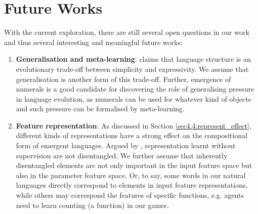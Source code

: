 \section{Future Works}
\label{sec5.2:future_work}

With the current exploration, there are still several open questions in our work and thus several interesting and meaningful future works:

\begin{enumerate}
    \item \textbf{Generalisation and meta-learning}: \cite{smith2013linguistic} claims that language structure is an evolutionary trade-off between simplicity and expressivity. We assume that generalisation is another form of this trade-off. Further, emergence of numerals is a good candidate for discovering the role of generalising pressure in language evolution, as numerals can be used for whatever kind of objects and such pressure can be formalised by meta-learning.
    \item \textbf{Feature representation}: As discussed in Section \ref{sec4.4:represent_effect}, different kinds of representations have a strong effect on the compositional form of emergent languages. Argued by \cite{locatello2018challenging}, representation learnt without supervision are not disentangled. We further assume that inherently disentangled elements are not only important in the input feature space but also in the parameter feature space. Or, to say, some words in our natural languages directly correspond to elements in input feature representations, while others may correspond the features of specific functions, e.g. agents need to learn counting (a function) in our games.
\end{enumerate}